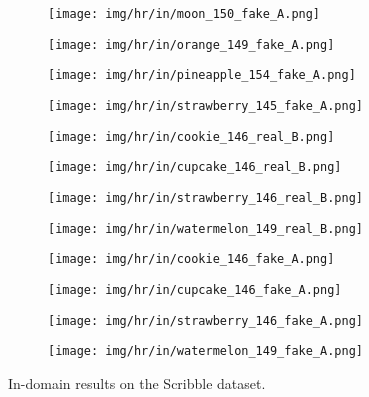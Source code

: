 \documentclass[10pt,twocolumn,letterpaper]{article}
\begin{document}
\begin{figure*}[tbp]
\begin{center}
  \begin{subfigure}[b]{\hrwidth\linewidth}
  \texttt{[image: img/hr/in/moon\_150\_fake\_A.png]}
  \end{subfigure}
  \begin{subfigure}[b]{\hrwidth\linewidth}
  \texttt{[image: img/hr/in/orange\_149\_fake\_A.png]}
  \end{subfigure}
\begin{subfigure}[b]{\hrwidth\linewidth}
  \texttt{[image: img/hr/in/pineapple\_154\_fake\_A.png]}
  \end{subfigure}
  \begin{subfigure}[b]{\hrwidth\linewidth}
  \texttt{[image: img/hr/in/strawberry\_145\_fake\_A.png]}
  \end{subfigure}

  \begin{subfigure}[b]{\hrwidth\linewidth}
  \texttt{[image: img/hr/in/cookie\_146\_real\_B.png]}
  \end{subfigure}
  \begin{subfigure}[b]{\hrwidth\linewidth}
  \texttt{[image: img/hr/in/cupcake\_146\_real\_B.png]}
  \end{subfigure}
\begin{subfigure}[b]{\hrwidth\linewidth}
  \texttt{[image: img/hr/in/strawberry\_146\_real\_B.png]}
  \end{subfigure}
  \begin{subfigure}[b]{\hrwidth\linewidth}
  \texttt{[image: img/hr/in/watermelon\_149\_real\_B.png]}
  \end{subfigure}

  \begin{subfigure}[b]{\hrwidth\linewidth}
  \texttt{[image: img/hr/in/cookie\_146\_fake\_A.png]}
  \end{subfigure}
  \begin{subfigure}[b]{\hrwidth\linewidth}
  \texttt{[image: img/hr/in/cupcake\_146\_fake\_A.png]}
  \end{subfigure}
\begin{subfigure}[b]{\hrwidth\linewidth}
  \texttt{[image: img/hr/in/strawberry\_146\_fake\_A.png]}
  \end{subfigure}
  \begin{subfigure}[b]{\hrwidth\linewidth}
  \texttt{[image: img/hr/in/watermelon\_149\_fake\_A.png]}
  \end{subfigure}
  
\end{center}
\caption{In-domain  results on the Scribble dataset.}
 \label{fig:in_res}
\end{figure*}


{\small


}
\end{document}
